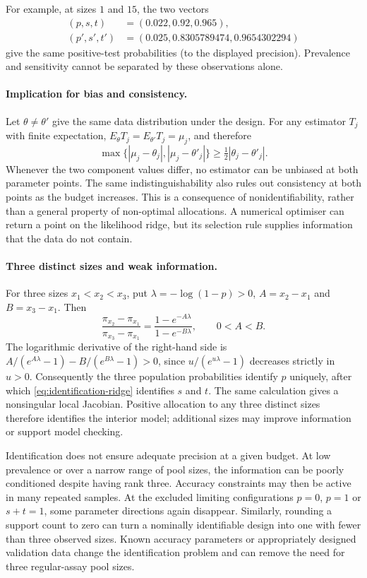 \documentclass[11pt]{article}
\begin{document}
For example, at sizes $1$ and $15$, the two vectors
\[
 \begin{aligned}
 (p,s,t)&=(0.022,0.92,0.965),\\
 (p',s',t')&=(0.025,0.8305789474,0.9654302294)
 \end{aligned}
\]
give the same positive-test probabilities (to the displayed precision). Prevalence and sensitivity cannot be separated by these observations alone.

\paragraph{Implication for bias and consistency.}
Let $\theta\ne\theta'$ give the same data distribution under the design. For any estimator $T_j$ with finite expectation, $E_\theta T_j=E_{\theta'}T_j=\mu_j$, and therefore
\begin{equation}\label{eq:nonident-bias-bound}
 \max\{|\mu_j-\theta_j|,|\mu_j-\theta'_j|\}
 \geq\tfrac12|\theta_j-\theta'_j|.
\end{equation}
Whenever the two component values differ, no estimator can be unbiased at both parameter points. The same indistinguishability also rules out consistency at both points as the budget increases. This is a consequence of nonidentifiability, rather than a general property of non-optimal allocations. A numerical optimiser can return a point on the likelihood ridge, but its selection rule supplies information that the data do not contain.

\paragraph{Three distinct sizes and weak information.}
For three sizes $x_1<x_2<x_3$, put $\lambda=-\log(1-p)>0$, $A=x_2-x_1$ and $B=x_3-x_1$. Then
\[
 \frac{\pi_{x_2}-\pi_{x_1}}{\pi_{x_3}-\pi_{x_1}}
 =\frac{1-e^{-A\lambda}}{1-e^{-B\lambda}},\qquad 0<A<B.
\]
The logarithmic derivative of the right-hand side is
$A/(e^{A\lambda}-1)-B/(e^{B\lambda}-1)>0$, since $u/(e^{u\lambda}-1)$ decreases strictly in $u>0$. Consequently the three population probabilities identify $p$ uniquely, after which \eqref{eq:identification-ridge} identifies $s$ and $t$. The same calculation gives a nonsingular local Jacobian. Positive allocation to any three distinct sizes therefore identifies the interior model; additional sizes may improve information or support model checking.

Identification does not ensure adequate precision at a given budget. At low prevalence or over a narrow range of pool sizes, the information can be poorly conditioned despite having rank three. Accuracy constraints may then be active in many repeated samples. At the excluded limiting configurations $p=0$, $p=1$ or $s+t=1$, some parameter directions again disappear. Similarly, rounding a support count to zero can turn a nominally identifiable design into one with fewer than three observed sizes. Known accuracy parameters or appropriately designed validation data change the identification problem and can remove the need for three regular-assay pool sizes.
\end{document}
